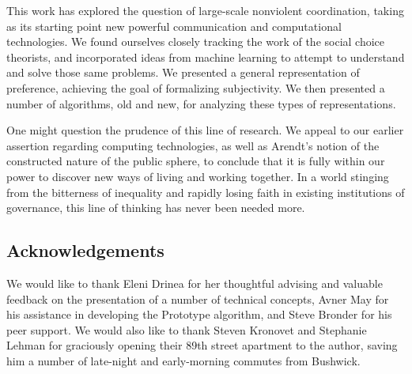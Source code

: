 \bigskip

This work has explored the question of large-scale nonviolent coordination, taking as its starting point new powerful communication and computational technologies.
We found ourselves closely tracking the work of the social choice theorists, and incorporated ideas from machine learning to attempt to understand and solve those same problems.
We presented a general representation of preference, achieving the goal of formalizing subjectivity.
We then presented a number of algorithms, old and new, for analyzing these types of representations.

\bigskip

One might question the prudence of this line of research.
We appeal to our earlier assertion regarding computing technologies, as well as Arendt's notion of the constructed nature of the public sphere, to conclude that it is fully within our power to discover new ways of living and working together.
In a world stinging from the bitterness of inequality and rapidly losing faith in existing institutions of governance, this line of thinking has never been needed more.

\subsection{Acknowledgements}

We would like to thank Eleni Drinea for her thoughtful advising and valuable feedback on the presentation of a number of technical concepts, Avner May for his assistance in developing the Prototype algorithm, and Steve Bronder for his peer support.
We would also like to thank Steven Kronovet and Stephanie Lehman for graciously opening their 89th street apartment to the author, saving him a number of late-night and early-morning commutes from Bushwick. 